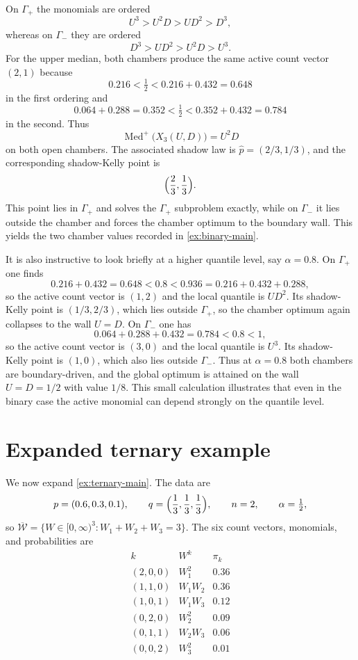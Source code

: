 \documentclass[11pt]{article}
\theoremstyle{definition}
\newcommand{\1}{\mathbf{1}}
\newcommand{\Med}{\operatorname{Med}}
\begin{document}
On $\Gamma_+$ the monomials are ordered
\[
U^3>U^2D>UD^2>D^3,
\]
whereas on $\Gamma_-$ they are ordered
\[
D^3>UD^2>U^2D>U^3.
\]
For the upper median, both chambers produce the same active count vector $(2,1)$ because
\[
0.216<\tfrac12<0.216+0.432=0.648
\]
in the first ordering and
\[
0.064+0.288=0.352<\tfrac12<0.352+0.432=0.784
\]
in the second. Thus
\[
\Med^+\bigl(X_3(U,D)\bigr)=U^2D
\]
on both open chambers. The associated shadow law is $\widehat p=(2/3,1/3)$, and the corresponding shadow-Kelly point is
\[
\Bigl(\frac23,\frac13\Bigr).
\]
This point lies in $\Gamma_+$ and solves the $\Gamma_+$ subproblem exactly, while on $\Gamma_-$ it lies outside the chamber and forces the chamber optimum to the boundary wall. This yields the two chamber values recorded in \cref{ex:binary-main}.

It is also instructive to look briefly at a higher quantile level, say $\alpha=0.8$. On $\Gamma_+$ one finds
\[
0.216+0.432=0.648<0.8<0.936=0.216+0.432+0.288,
\]
so the active count vector is $(1,2)$ and the local quantile is $UD^2$. Its shadow-Kelly point is $(1/3,2/3)$, which lies outside $\Gamma_+$, so the chamber optimum again collapses to the wall $U=D$. On $\Gamma_-$ one has
\[
0.064+0.288+0.432=0.784<0.8<1,
\]
so the active count vector is $(3,0)$ and the local quantile is $U^3$. Its shadow-Kelly point is $(1,0)$, which also lies outside $\Gamma_-$. Thus at $\alpha=0.8$ both chambers are boundary-driven, and the global optimum is attained on the wall $U=D=1/2$ with value $1/8$. This small calculation illustrates that even in the binary case the active monomial can depend strongly on the quantile level.

\section{Expanded ternary example}\label{app:ternary-example}
We now expand \cref{ex:ternary-main}. The data are
\[
p=(0.6,0.3,0.1),
\qquad
q=\Bigl(\frac13,\frac13,\frac13\Bigr),
\qquad
n=2,
\qquad
\alpha=\tfrac12,
\]
so $\overline{\mathcal W}=\{W\in[0,\infty)^3:W_1+W_2+W_3=3\}$. The six count vectors, monomials, and probabilities are
\[
\begin{array}{c|c|c}
k & W^k & \pi_k \\ \hline
(2,0,0) & W_1^2 & 0.36 \\
(1,1,0) & W_1W_2 & 0.36 \\
(1,0,1) & W_1W_3 & 0.12 \\
(0,2,0) & W_2^2 & 0.09 \\
(0,1,1) & W_2W_3 & 0.06 \\
(0,0,2) & W_3^2 & 0.01
\end{array}
\]
\end{document}
